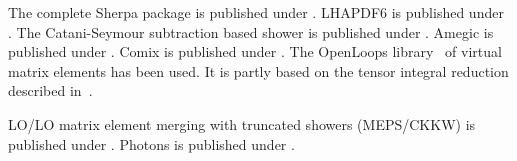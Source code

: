 \documentclass{article}
\begin{document}
The complete Sherpa package is published under \cite{Gleisberg:2008ta}.
LHAPDF6 is published under \cite{Buckley:2014ana}.
The Catani-Seymour subtraction based shower is published under \cite{Schumann:2007mg}.
Amegic is published under \cite{Krauss:2001iv}.
Comix is published under \cite{Gleisberg:2008fv}.
The OpenLoops library~\cite{Cascioli:2011va} of virtual
matrix elements has been used. 
It is partly based on the tensor integral reduction described in~\cite{Denner:2002ii,Denner:2005nn,Denner:2010tr,Denner:2014gla}.

LO/LO matrix element merging with truncated showers (MEPS/CKKW) is published under \cite{Hoeche:2009rj}.
Photons is published under \cite{Schonherr:2008av}.
\end{document}
